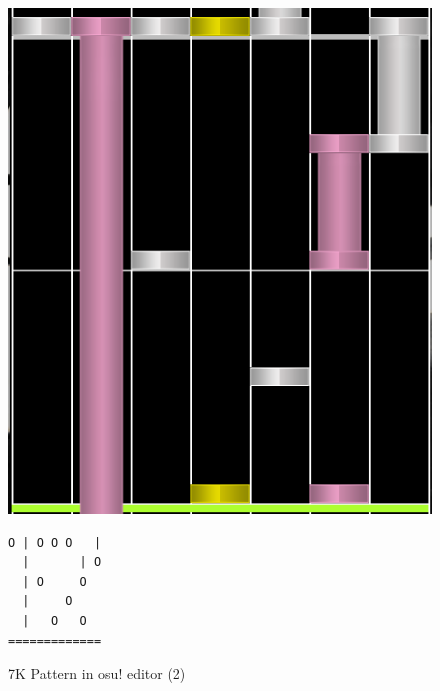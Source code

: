 \begin{figure}[H]
    \centering
    \begin{minipage}{.5\textwidth}
        \centering
        \includegraphics[scale=0.3]{imgs/osupattern2}
    \end{minipage}%
    \begin{minipage}{0.5\textwidth}
        \centering
        \begin{verbatim}
O | O O O   |
  |       | O
  | O     O
  |     O
  |   O   O
=============
        \end{verbatim}
    \end{minipage}
    \caption{7K Pattern in osu! editor (2)}
    \label{fig:osupattern2}
\end{figure}

